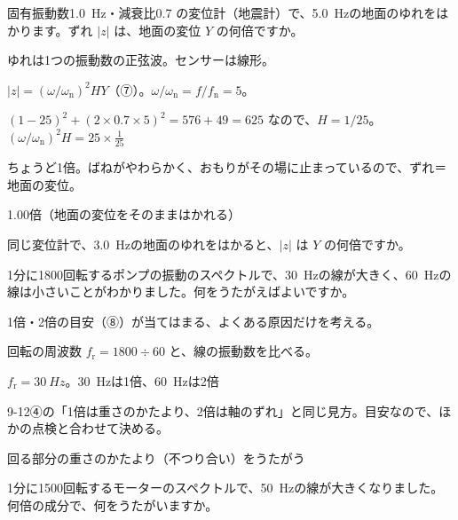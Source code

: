 \begin{reidai}
\label{ph:波-10:ex12}固有振動数\qty{1.0}{Hz}・減衰比0.7 の変位計（地震計）で、\qty{5.0}{Hz}の地面のゆれをはかります。ずれ $|z|$ は、地面の変位 $Y$ の何倍ですか。
\par{} ゆれは1つの振動数の正弦波。センサーは線形。
\par\kangaekata $|z|=(\omega/\omega_{\mathrm n})^2HY$（⑦）。$\omega/\omega_{\mathrm n}=f/f_{\mathrm n}=5$。
\par\shiki $(1-25)^2+(2\times0.7\times5)^2=576+49=625$ なので、$H=1/25$。\newline $(\omega/\omega_{\mathrm n})^2H=25\times\tfrac{1}{25}$
\par{} ちょうど1倍。ばねがやわらかく、おもりがその場に止まっているので、ずれ＝地面の変位。
\par\kotae 1.00倍（地面の変位をそのままはかれる）
\end{reidai}
\begin{jibun}
同じ変位計で、\qty{3.0}{Hz}の地面のゆれをはかると、$|z|$ は $Y$ の何倍ですか。
\end{jibun}

\begin{reidai}[ポンプのスペクトルを読む]
\label{ph:波-10:ex13}1分に\num{1800}回転するポンプの振動のスペクトルで、\qty{30}{Hz}の線が大きく、\qty{60}{Hz}の線は小さいことがわかりました。何をうたがえばよいですか。
\par{} 1倍・2倍の目安（⑧）が当てはまる、よくある原因だけを考える。
\par\kangaekata 回転の周波数 $f_{\mathrm r}=1800\div60$ と、線の振動数を比べる。
\par\shiki $f_{\mathrm r}=\qty{30}{Hz}$。\qty{30}{Hz}は1倍、\qty{60}{Hz}は2倍
\par{} 9-12④の「1倍は重さのかたより、2倍は軸のずれ」と同じ見方。目安なので、ほかの点検と合わせて決める。
\par\kotae 回る部分の重さのかたより（不つり合い）をうたがう
\end{reidai}
\begin{jibun}
1分に\num{1500}回転するモーターのスペクトルで、\qty{50}{Hz}の線が大きくなりました。何倍の成分で、何をうたがいますか。
\end{jibun}

